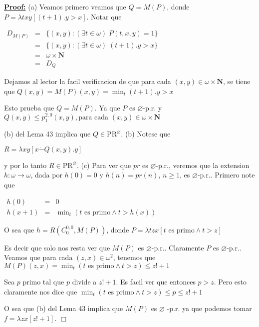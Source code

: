 \textbf{\underline{Proof:}} (a) Veamos primero veamos que \(Q=M(P)\), donde \(P=\lambda txy\left[ (t+1).y >x \right] \). Notar que

\(\displaystyle \begin{array}{rcl} D_{M(P)} & =& \{(x,y):(\exists t\in \omega )\;P(t,x,y)=1\} \\ & =& \{(x,y):(\exists t\in \omega )\;(t+1).y >x\} \\ & =& \omega \times \mathbf{N} \\ & =& D_{Q} \end{array} \)

Dejamos al lector la facil verificacion de que para cada \((x,y)\in \omega \times \mathbf{N}\), se tiene que
\(\displaystyle Q(x,y)=M(P)(x,y)=\min_{t}(t+1).y >x \)

Esto prueba que \(Q=M(P)\). Ya que \(P\) es \(\varnothing \)-p.r. y
\(\displaystyle Q(x,y)\leq p_{1}^{2,0}(x,y),\text{para cada }(x,y)\in \omega \times \mathbf{N } \)

(b) del Lema 43 implica que \(Q\in \mathrm{PR}^{\varnothing }\).
(b) Notese que

\(\displaystyle R=\lambda xy\left[ x\dot{-}Q(x,y).y\right] \)

y por lo tanto \(R\in \mathrm{PR}^{\varnothing }\).
(c) Para ver que \(pr\) es \(\varnothing \)-p.r., veremos que la extension \( h:\omega \rightarrow \omega \), dada por \(h(0)=0\) y \(h(n)=pr(n)\), \(n\geq 1\), es \(\varnothing \)-p.r.. Primero note que

\(\displaystyle \begin{array}{rcl} h(0) & =& 0 \\ h(x+1) & =& \min\nolimits_{t}\left( t\text{ es primo}\wedge t >h(x)\right) \end{array} \)

O sea que \(h=R\left( C_{0}^{0,0},M(P)\right) \), donde
\(\displaystyle P=\lambda tzx\left[ t\text{ es primo}\wedge t >z\right] \)

Es decir que solo nos resta ver que \(M(P)\) es \(\varnothing \)-p.r.. Claramente \( P\) es \(\varnothing \)-p.r.. Veamos que para cada \((z,x)\in \omega ^{2}\), tenemos que
\(\displaystyle M(P)(z,x)=\min\nolimits_{t}\left( t\text{ es primo}\wedge t >z\right) \leq z!+1 \)

Sea \(p\) primo tal que \(p\) divide a \(z!+1\). Es facil ver que entonces \(p >z\). Pero esto claramente nos dice que
\(\displaystyle \min\nolimits_{t}\left( t\text{ es primo}\wedge t >z\right) \leq p\leq z!+1 \)

O sea que (b) del Lema 43 implica que \(M(P)\) es \(\varnothing \) -p.r. ya que podemos tomar \(f=\lambda zx\left[ z!+1\right] \). \(\Box\)


